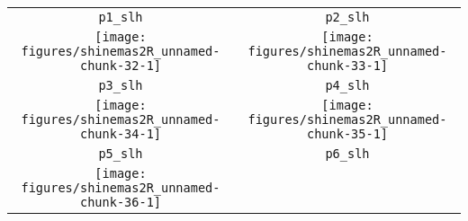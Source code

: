 \documentclass{article}\usepackage[]{graphicx}\usepackage[]{color}
\newenvironment{knitrout}{}{} %
\begin{document}
\begin{itemize}
\begin{center}
\begin{tabular}{cc}
\texttt{p1\_slh} & \texttt{p2\_slh} \\
\begin{knitrout}
\definecolor{shadecolor}{rgb}{0.969, 0.969, 0.969}\color{fgcolor}

{\centering \texttt{[image: figures/shinemas2R\_unnamed-chunk-32-1]} 

}



\end{knitrout}
&
\begin{knitrout}
\definecolor{shadecolor}{rgb}{0.969, 0.969, 0.969}\color{fgcolor}

{\centering \texttt{[image: figures/shinemas2R\_unnamed-chunk-33-1]} 

}



\end{knitrout}
\\
\texttt{p3\_slh} & \texttt{p4\_slh} \\
\begin{knitrout}
\definecolor{shadecolor}{rgb}{0.969, 0.969, 0.969}\color{fgcolor}

{\centering \texttt{[image: figures/shinemas2R\_unnamed-chunk-34-1]} 

}



\end{knitrout}
&
\begin{knitrout}
\definecolor{shadecolor}{rgb}{0.969, 0.969, 0.969}\color{fgcolor}

{\centering \texttt{[image: figures/shinemas2R\_unnamed-chunk-35-1]} 

}



\end{knitrout}
\\
\texttt{p5\_slh} & \texttt{p6\_slh} \\
\begin{knitrout}
\definecolor{shadecolor}{rgb}{0.969, 0.969, 0.969}\color{fgcolor}

{\centering \texttt{[image: figures/shinemas2R\_unnamed-chunk-36-1]} 

}



\end{knitrout}
&
\begin{knitrout}
\definecolor{shadecolor}{rgb}{0.969, 0.969, 0.969}\color{fgcolor}


\end{knitrout}
\end{tabular}
\end{center}
\end{itemize}
\end{document}
